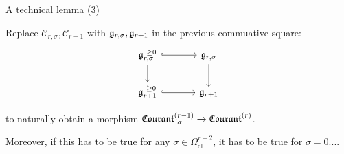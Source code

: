 \documentclass[beamer,10pt]{standalone}
\begin{document}
\begin{frame}{A technical lemma (3)}
	\begin{upshotblock}
	  Replace $\mathcal{C}_{r,\sigma}, \mathcal{C}_{r+1}$ with $\g_{r,\sigma}, \g_{r+1}$ in the previous commuative square:
		\begin{displaymath}
			\begin{tikzcd}[ampersand replacement=\&, column sep = large]
				\g_{r,\sigma}^{~\geq 0} \ar[r,hook] \ar[d, ]
				\& \g_{r,\sigma} \ar[d, ]
				\\
				\g_{r+1}^{~\geq 0} \ar[r,hook] \& \g_{r+1}
			\end{tikzcd}
		\end{displaymath}
		\medskip

		to naturally obtain a morphism $\Courant[\sigma]{r-1} \to \Courant{r}$.
	\end{upshotblock}
	\vfill

	Moreover, if this has to be true for any $\sigma \in \Omega^{r+2}_{\mathrm{cl}}$, it has to be true for $\sigma = 0$.... 
\end{frame}
\end{document}
